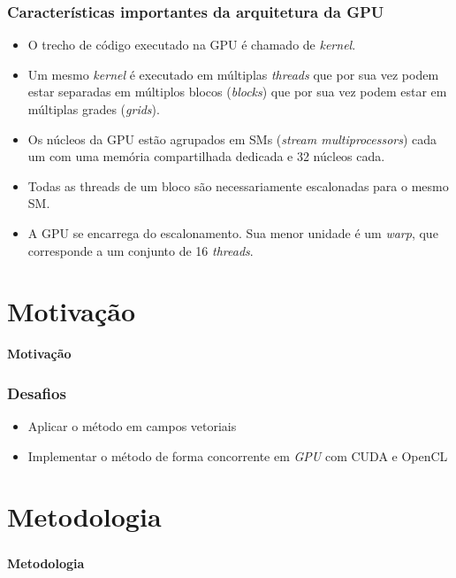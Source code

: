 \documentclass[brazil, 10pt]{beamer}
\begin{document}
\begin{frame}
  \frametitle{Características importantes da arquitetura da GPU}
  
  \begin{itemize}
    \item O trecho de código executado na GPU é chamado de \textit{kernel}.
    \item Um mesmo \textit{kernel} é executado em múltiplas \textit{threads} que por sua vez podem estar separadas em múltiplos blocos (\textit{blocks}) que por sua vez podem estar em múltiplas grades (\textit{grids}).
    \item Os núcleos da GPU estão agrupados em SMs (\textit{stream multiprocessors}) cada um com uma memória compartilhada dedicada e 32 núcleos cada.
    \item Todas as threads de um bloco são necessariamente escalonadas para o mesmo SM.
    \item A GPU se encarrega do escalonamento. Sua menor unidade é um \textit{warp}, que corresponde a um conjunto de 16 \textit{threads}.
  \end{itemize}
\end{frame}

\section{Motivação}
\begin{frame}
  \begin{Large}
  \begin{center}
  \textbf{Motivação}
  \end{center}
  \end{Large}
\end{frame}

\begin{frame}
  \frametitle{Desafios}

  \begin{itemize}
    \item Aplicar o método em campos vetoriais
    \item Implementar o método de forma concorrente em \textit{GPU} com CUDA e OpenCL
  \end{itemize}
\end{frame}

\section{Metodologia}
\begin{frame}
  \frametitle{}
  \framesubtitle{}
  \begin{Large}
  \begin{center}
  \textbf{Metodologia}
  \end{center}
  \end{Large}
\end{frame}
\end{document}
